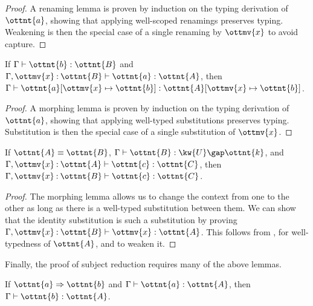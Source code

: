 \documentclass[a4paper,UKenglish,cleveref,autoref,thm-restate]{lipics-v2021}
\begin{document}
\begin{proof}
  A renaming lemma is proven by induction on the typing derivation of $\ottnt{a}$,
  showing that applying well-scoped renamings preserves typing.
  Weakening is then the special case of a single renaming by $\ottmv{x}$ to avoid capture.
\end{proof}

\begin{lemma}[Substitution (w.t.)] \label{lem:wt:subst}
  If $ \Gamma  \vdash  \ottnt{b}  \mathrel{:}  \ottnt{B} $ and $  \Gamma ,  \ottmv{x}  \mathbin{:}  \ottnt{B}   \vdash  \ottnt{a}  \mathrel{:}  \ottnt{A} $,
  then $ \Gamma  \vdash   \ottnt{a} [  \ottmv{x}  \mapsto  \ottnt{b}  ]   \mathrel{:}   \ottnt{A} [  \ottmv{x}  \mapsto  \ottnt{b}  ]  $.
\end{lemma}

\begin{proof}
  A morphing lemma is proven by induction on the typing derivation of $\ottnt{a}$,
  showing that applying well-typed substitutions preserves typing.
  Substitution is then the special case of a single substitution of $\ottmv{x}$.
\end{proof}

\begin{lemma}[Replacement (w.t.)] \label{lem:wt:replace}
  If $ \ottnt{A}  \equiv  \ottnt{B} $, $ \Gamma  \vdash  \ottnt{B}  \mathrel{:}   \kw{U} \gap  \ottnt{k}  $, and $  \Gamma ,  \ottmv{x}  \mathbin{:}  \ottnt{A}   \vdash  \ottnt{c}  \mathrel{:}  \ottnt{C} $,
  then $  \Gamma ,  \ottmv{x}  \mathbin{:}  \ottnt{B}   \vdash  \ottnt{c}  \mathrel{:}  \ottnt{C} $.
\end{lemma}

\begin{proof}
  The morphing lemma allows us to change the context from one to the other
  as long as there is a well-typed substitution between them.
  We can show that the identity substitution is such a substitution
  by proving $  \Gamma ,  \ottmv{x}  \mathbin{:}  \ottnt{B}   \vdash  \ottmv{x}  \mathrel{:}  \ottnt{A} $.
  This follows from ,
   for well-typedness of $\ottnt{A}$,
  and  to weaken it.
\end{proof}

Finally, the proof of subject reduction requires many of the above lemmas.

\begin{theorem} \label{lem:preservation}
  If $ \ottnt{a}  \Rightarrow  \ottnt{b} $ and $ \Gamma  \vdash  \ottnt{a}  \mathrel{:}  \ottnt{A} $, then $ \Gamma  \vdash  \ottnt{b}  \mathrel{:}  \ottnt{A} $.
\end{theorem}
\end{document}
